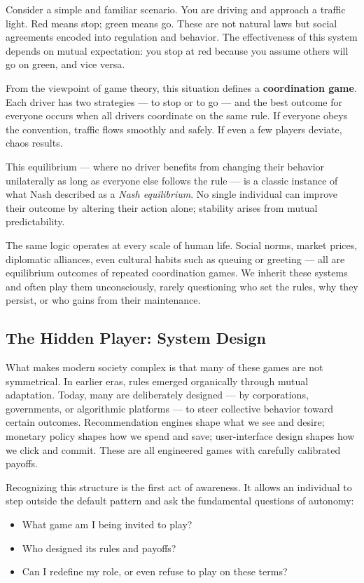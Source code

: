 \documentclass[12pt,twoside]{book}
\begin{document}
Consider a simple and familiar scenario.  
You are driving and approach a traffic light. Red means stop; green means go.  
These are not natural laws but social agreements encoded into regulation and behavior.  
The effectiveness of this system depends on mutual expectation: you stop at red because you assume others will go on green, and vice versa.  

From the viewpoint of game theory, this situation defines a \textbf{coordination game}.  
Each driver has two strategies --- to stop or to go --- and the best outcome for everyone occurs when all drivers coordinate on the same rule.  
If everyone obeys the convention, traffic flows smoothly and safely.  
If even a few players deviate, chaos results.  

This equilibrium --- where no driver benefits from changing their behavior unilaterally as long as everyone else follows the rule --- is a classic instance of what Nash described as a \emph{Nash equilibrium}.  
No single individual can improve their outcome by altering their action alone; stability arises from mutual predictability.

The same logic operates at every scale of human life.  
Social norms, market prices, diplomatic alliances, even cultural habits such as queuing or greeting --- all are equilibrium outcomes of repeated coordination games.  
We inherit these systems and often play them unconsciously, rarely questioning who set the rules, why they persist, or who gains from their maintenance.

\subsection*{The Hidden Player: System Design}

What makes modern society complex is that many of these games are not symmetrical.  
In earlier eras, rules emerged organically through mutual adaptation.  
Today, many are deliberately designed --- by corporations, governments, or algorithmic platforms --- to steer collective behavior toward certain outcomes.  
Recommendation engines shape what we see and desire; monetary policy shapes how we spend and save; user-interface design shapes how we click and commit.  
These are all engineered games with carefully calibrated payoffs.  

Recognizing this structure is the first act of awareness.  
It allows an individual to step outside the default pattern and ask the fundamental questions of autonomy:  
\begin{itemize}
  \item What game am I being invited to play?  
  \item Who designed its rules and payoffs?  
  \item Can I redefine my role, or even refuse to play on these terms?
\end{itemize}
\end{document}
